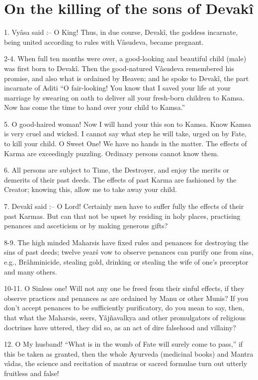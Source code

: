 ﻿\chapter{On the killing of the sons of Devak\^i}

1. Vy\^asa said :-- O King! Thus, in due course, Devak\^i, the goddess incarnate, being united according to rules with V\^asudeva, became pregnant.

2-4. When full ten months were over, a good-looking and beautiful child (male) was first born to Devak\^i. Then the good-natured V\^asudeva remembered his promise, and also what is ordained by Heaven; and he spoke to Devak\^i, the part incarnate of Aditi ``O fair-looking! You know that I saved your life at your marriage by swearing on oath to deliver all your fresh-born children to Kamsa. Now has come the time to hand over your child to Kamsa.''

5. O good-haired woman! Now I will hand your this son to Kamsa. Know Kamsa is very cruel and wicked. I cannot say what step he will take, urged on by Fate, to kill your child. O Sweet One! We have no hands in the matter. The effects of Karma are exceedingly puzzling. Ordinary persons cannot know them.

6. All persons are subject to Time, the Destroyer, and enjoy the merits or demerits of their past deeds. The effects of past Karma are fashioned by the Creator; knowing this, allow me to take away your child.

7. Devak\^i said :-- O Lord! Certainly men have to suffer fully the effects of their past Karmas. But can that not be upset by residing in holy places, practising penances and asceticism or by making generous gifts?

8-9. The high minded Maharsis have fixed rules and penances for destroying the sins of past deeds; twelve year\'s vow to observe penances can purify one from sins, e.g., Br\^ahminicide, stealing gold, drinking or stealing the wife of one's preceptor and many others.

10-11. O Sinless one! Will not any one be freed from their sinful effects, if they observe practices and penances as are ordained by Manu or other Munis? If you don't accept penances to be sufficiently purificatory, do you mean to say, then, that what the Maharsis, seers, Y\^ajñavalkya and other promulgators of religious doctrines have uttered, they did so, as an act of dire falsehood and villainy?

12. O My husband! ``What is in the womb of Fate will surely come to pass,'' if this be taken as granted, then the whole Ayurveda (medicinal books) and Mantra v\^adas, the science and recitation of mantras or sacred formulae turn out utterly fruitless and false!

